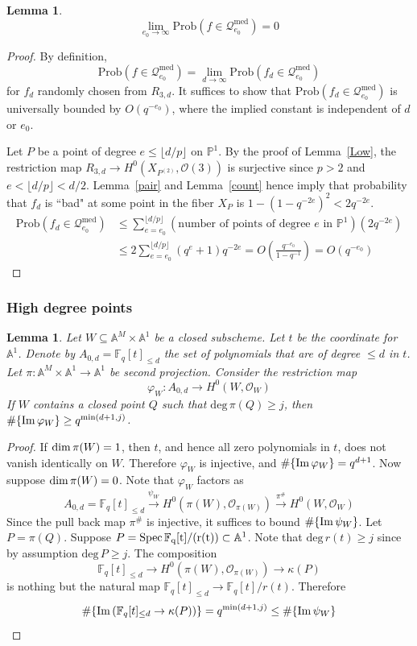 \documentclass[12pt]{article}
\theoremstyle{plain}
\newtheorem{lemma}[equation]{Lemma}
\theoremstyle{definition}
\newcommand{\IA}{\mathbb{A}}
\newcommand{\IF}{\mathbb{F}}
\newcommand{\IP}{\mathbb{P}}
\newcommand{\sO}{\mathcal{O}}
\newcommand{\sQ}{\mathcal{Q}}
\renewcommand{\deg}{\mathrm{deg}\,}
\newcommand{\Spec}{\rm Spec\,}
\renewcommand\dim{{\rm dim\,}}
\newcommand{\im}{{\rm Im\,}}
\newcommand{\<}{\langle}
\renewcommand{\>}{\rangle}
\newcommand{\Prob}{\mathrm{Prob}}
\begin{document}
\begin{lemma}
\label{Medium}
$$\lim_{e_0 \to \infty} \Prob( f \in  \sQ_{e_0}^{\mathrm{med}}) = 0 $$
\end{lemma}
\begin{proof}
By definition, 
$$ \Prob( f \in  \sQ_{e_0}^{\mathrm{med}}) = \lim_{d \to \infty} \Prob(f_d \in \sQ_{e_0}^{\mathrm{med}})$$
for $f_d$ randomly chosen from $R_{3, d}$. It suffices to show that $\Prob(f_d \in \sQ_{e_0}^{\mathrm{med}})$ is universally bounded by $O(q^{-e_0})$, where the implied constant is independent of $d$ or $e_0$. 

Let $P$ be a point of degree $e \le \lfloor d/p \rfloor$ on $\IP^1$. By the proof of Lemma~\ref{Low}, the restriction map $R_{3, d} \to H^0(X_{P^{(2)}}, \sO(3))$ is surjective since $p > 2$ and $e < \lfloor d/p \rfloor < d/2$. Lemma~\ref{pair} and Lemma~\ref{count} hence imply that probability that $f_d$ is ``bad" at some point in the fiber $X_P$ is $1 - (1 - q^{-2e})^2 < 2q^{-2e}$. 
\begin{align*}
\Prob(f_d \in \sQ_{e_0}^{\mathrm{med}}) &\le \sum_{e = e_0}^{\lfloor d/p \rfloor} (\text{number of points of degree $e$ in $\IP^1$})(2q^{-2e}) \\
&\le 2 \sum_{e = e_0}^{\lfloor d/p \rfloor}(q^{e} + 1) q^{-2e} = O(\frac{q^{-e_0}}{1 - q^{-1}}) = O(q^{-e_0})
\end{align*} 
\end{proof}

\subsubsection{High degree points}
\begin{lemma}
\label{highprep}
Let $W \subseteq \IA^M \times \IA^1$ be a closed subscheme. Let $t$ be the coordinate for $\IA^1$. Denote by $A_{0, d} = \IF_q[t]_{\le d}$ the set of polynomials that are of degree $\le d$ in $t$. Let $\pi : \IA^M \times \IA^1 \to \IA^1$ be second projection. Consider the restriction map 
$$ \varphi_W : A_{0, d} \to H^0(W, \sO_W) $$
If $W$ contains a closed point $Q$ such that $\deg \pi(Q) \ge j$, then $\# \{ \im \varphi_W \} \ge q^{\min(d + 1, j)}$. 
\end{lemma}
\begin{proof}
If $\dim \pi(W) = 1$, then $t$, and hence all zero polynomials in $t$, does not vanish identically on $W$. Therefore $\varphi_W$ is injective, and $\# \{ \im \varphi_W \} = q^{d + 1}$. 
Now suppose $\dim \pi(W) = 0$. Note that $\varphi_W$ factors as
$$ A_{0, d} = \IF_q[t]_{\le d} \stackrel{\psi_W}{\to} H^0(\pi(W), \sO_{\pi(W)}) \stackrel{\pi^\#}{\to} H^0(W, \sO_W) $$ 
Since the pull back map $\pi^\#$ is injective, it suffices to bound $\# \{\im \psi_W \}$. Let $P = \pi(Q)$. Suppose $P = \Spec \IF_q[t]/(r(t)) \subset \IA^1$. Note that $\deg r(t) \ge j$ since by assumption $\deg P \ge j$. The composition 
$$ \IF_q[t]_{\le d} \to H^0(\pi(W), \sO_{\pi(W)}) \to \kappa(P) $$
is nothing but the natural map $\IF_q[t]_{\le d} \to \IF_q[t]/r(t)$. Therefore 
$$ \#\{ \im(\IF_q[t]_{\le d} \to \kappa(P)) \} = q^{\min(d + 1, j)}  \le \# \{\im \psi_W \}$$
\end{proof}
\end{document}

